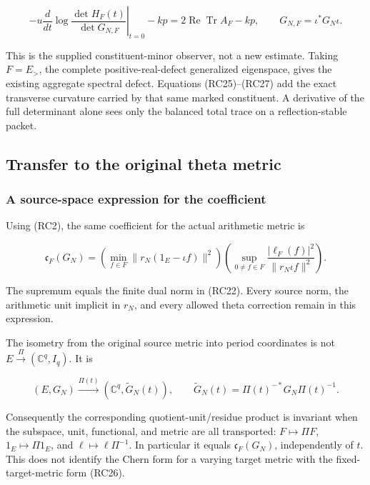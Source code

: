 \[
-u\left.\frac{d}{dt}
\log\frac{\det H_F(t)}{\det G_{N,F}}\right|_{t=0}-kp
=2\operatorname{Re}\operatorname{Tr}A_F-kp,
\qquad G_{N,F}=\iota^*G_N\iota.
\tag{RC28}
\]

This is the supplied constituent-minor observer, not a new estimate. Taking \(F=E_>\), the complete positive-real-defect generalized eigenspace, gives the existing aggregate spectral defect. Equations (RC25)--(RC27) add the exact transverse curvature carried by that same marked constituent. A derivative of the full determinant alone sees only the balanced total trace on a reflection-stable packet.

\subsection{Transfer to the original theta metric}\label{endpoint-residue_original--transfer-to-the-original-theta-metric}

\subsubsection{A source-space expression for the coefficient}\label{endpoint-residue_original--a-source-space-expression-for-the-coefficient}

Using (RC2), the same coefficient for the actual arithmetic metric is

\[
\boxed{\mathfrak c_F(G_N)=
\left(\min_{f\in F}\|r_N(1_E-\iota f)\|^2\right)
\left(\sup_{0\ne f\in F}
\frac{|\ell_F(f)|^2}{\|r_N\iota f\|^2}\right).}
\tag{RC29}
\]

The supremum equals the finite dual norm in (RC22). Every source norm, the arithmetic unit implicit in \(r_N\), and every allowed theta correction remain in this expression.

The isometry from the original source metric into period coordinates is not \(E\xrightarrow{\Pi}(\mathbb C^q,I_q)\). It is

\[
(E,G_N)\xrightarrow{\Pi(t)}
(\mathbb C^q,\widetilde G_N(t)),
\qquad \widetilde G_N(t)=\Pi(t)^{-*}G_N\Pi(t)^{-1}.
\tag{RC30}
\]

Consequently the corresponding quotient-unit/residue product is invariant when the subspace, unit, functional, and metric are all transported: \(F\mapsto\Pi F\), \(1_E\mapsto\Pi1_E\), and \(\ell\mapsto\ell\Pi^{-1}\). In particular it equals \(\mathfrak c_F(G_N)\), independently of \(t\). This does not identify the Chern form for a varying target metric with the fixed-target-metric form (RC26).


